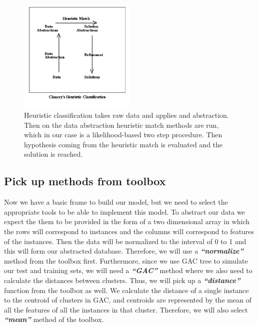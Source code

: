 \documentclass[conference]{IEEEtran}
\begin{document}
\begin{figure}
\begin{center}
\includegraphics[width=0.5\textwidth]{heuristic_classification.png}
\end{center}
\caption{Heuristic classification takes raw data and applies and abstraction. Then on the data abstraction heuristic match methods are run, which in our case is a likelihood-based two step procedure. Then hypothesis coming from the heuristic match is evaluated and the solution is reached.}\label{fig:heuristic}
\end{figure}

\subsection{Pick up methods from toolbox}
Now we have a basic frame to build our model, but we need to select the appropriate tools to be able to implement this model.
To abstract our data we expect the them to be provided in the form of a two dimensional array in which the rows will correspond to instances and the columns will correspond to features of the instances.
Then the data will be normalized to the interval of 0 to 1 and this will form our abstracted database.
Therefore, we will use a \textbf{\textit{``normalize''}} method from the toolbox first.
Furthermore, since we use GAC tree to simulate our test and training sets, we will need a \textbf{\textit{``GAC''}} method where we also need to calculate the distances between clusters.
Thus, we will pick up a \textbf{\textit{``distance''}} function from the toolbox as well.
We calculate the distance of a single instance to the centroid of clusters in GAC, and centroids are represented by the mean of all the features of all the instances in that cluster.
Therefore, we will also select \textbf{\textit{``mean''}} method of the toolbox.
\end{document}
